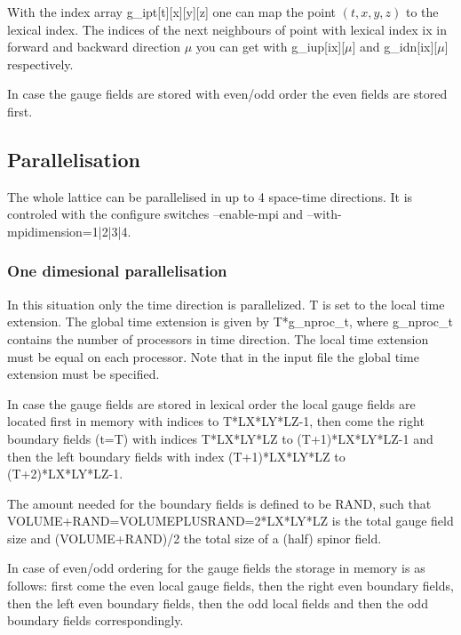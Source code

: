 With the index array {\ttfamily g\_ipt[t][x][y][z]} one can map the
point $(t,x,y,z)$ to the lexical index. The indices of the next
neighbours of point with lexical index {\ttfamily ix} in forward and
backward direction $\mu$ you can get with
{\ttfamily g\_iup[ix][$\mu$]} and {\ttfamily g\_idn[ix][$\mu$]}
respectively.

In case the gauge fields are stored with even/odd order the even
fields are stored first. 

\subsection{Parallelisation}

The whole lattice can be parallelised in up to 4 space-time directions.
It is controled with the configure switches {\ttfamily --enable-mpi}
and {\ttfamily --with-mpidimension=1|2|3|4}. 

\subsubsection{One dimesional parallelisation}

In this situation only the time direction is parallelized. {\ttfamily
  T} is set to the local time extension. The global time extension is
given by {\ttfamily T*g\_nproc\_t}, where {\ttfamily g\_nproc\_t}
contains the number of processors in time direction. The local time
extension must be equal on each processor. Note that in the input file
the global time extension must be specified. 

In case the gauge fields are stored in lexical order the local gauge
fields are located first in memory with indices { to
  T*LX*LY*LZ-1}, then come the right boundary fields ({\ttfamily t=T})
with indices {\ttfamily T*LX*LY*LZ} to {\ttfamily (T+1)*LX*LY*LZ-1}
and then the left boundary fields with index {\ttfamily
  (T+1)*LX*LY*LZ} to {\ttfamily (T+2)*LX*LY*LZ-1}. 

The amount needed for the boundary fields is defined to be {\ttfamily
  RAND}, such that {\ttfamily VOLUME+RAND=VOLUMEPLUSRAND=2*LX*LY*LZ}
is the total gauge field size and {\ttfamily (VOLUME+RAND)/2} the
total size of a (half) spinor field. 

In case of even/odd ordering for the gauge fields the storage in
memory is as follows: first come the even local gauge fields, then the
right even boundary fields, then the left even boundary fields, then
the odd local fields and then the odd boundary fields correspondingly.

